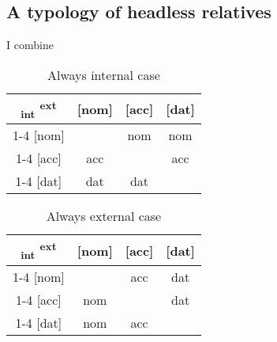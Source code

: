 \subsection{A typology of headless relatives}

I combine


\begin{table}[H]
  \center
  \caption{Always internal case}
  \begin{tabular}{c|c|c|c}
    \toprule
   \textsubscript{\ac{int}} \textsuperscript{\ac{ext}}
          & [\ac{nom}]
          & [\ac{acc}]
          & [\ac{dat}]
          \\ \cmidrule{1-4}
      [\ac{nom}]
          & \xcancel{\phantom{xx}}
          & \ac{nom}
          & \ac{nom}
          \\ \cmidrule{1-4}
      [\ac{acc}]
          & \ac{acc}
          & \xcancel{\phantom{xx}}
          & \ac{acc}
          \\ \cmidrule{1-4}
      [\ac{dat}]
          & \ac{dat}
          & \ac{dat}
          & \xcancel{\phantom{xx}}
          \\
    \bottomrule
  \end{tabular}
  \label{tbl:no-case-competition-int}
\end{table}

\begin{table}[H]
  \center
  \caption{Always external case}
  \begin{tabular}{c|c|c|c}
    \toprule
   \textsubscript{\ac{int}} \textsuperscript{\ac{ext}}
          & [\ac{nom}]
          & [\ac{acc}]
          & [\ac{dat}]
          \\ \cmidrule{1-4}
      [\ac{nom}]
          & \xcancel{\phantom{xx}}
          & \ac{acc}
          & \ac{dat}
          \\ \cmidrule{1-4}
      [\ac{acc}]
          & \ac{nom}
          & \xcancel{\phantom{xx}}
          & \ac{dat}
          \\ \cmidrule{1-4}
      [\ac{dat}]
          & \ac{nom}
          & \ac{acc}
          & \xcancel{\phantom{xx}}
          \\
    \bottomrule
  \end{tabular}
  \label{tbl:no-case-competition-ext}
\end{table}



